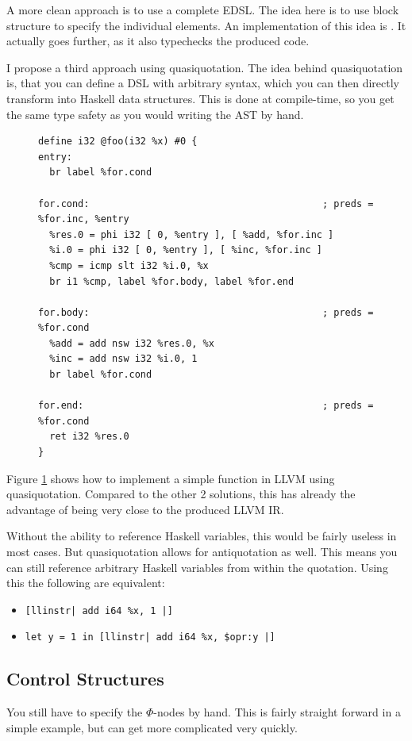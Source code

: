 \documentclass[a4paper,bibliography=totocnumbered,parskip,headsepline]{scrbook}
\begin{document}
A more clean approach is to use a complete EDSL.
The idea here is to use block structure to specify the individual elements.
An implementation of this idea is .
It actually goes further, as it also typechecks the produced code.

I propose a third approach using quasiquotation\cite{mainland2007quote}.
The idea behind quasiquotation is, that you can define a DSL with arbitrary syntax, which you can then directly transform into Haskell data structures.
This is done at compile-time, so you get the same type safety as you would writing the AST by hand.

\begin{figure}
\begin{lstlisting}
define i32 @foo(i32 %x) #0 {
entry:
  br label %for.cond

for.cond:                                         ; preds = %for.inc, %entry
  %res.0 = phi i32 [ 0, %entry ], [ %add, %for.inc ]
  %i.0 = phi i32 [ 0, %entry ], [ %inc, %for.inc ]
  %cmp = icmp slt i32 %i.0, %x
  br i1 %cmp, label %for.body, label %for.end

for.body:                                         ; preds = %for.cond
  %add = add nsw i32 %res.0, %x
  %inc = add nsw i32 %i.0, 1
  br label %for.cond

for.end:                                          ; preds = %for.cond
  ret i32 %res.0
}
\end{lstlisting}
\label{fig:simplequote}
\end{figure}

Figure \ref{fig:simplequote} shows how to implement a simple function in LLVM using quasiquotation.
Compared to the other 2 solutions, this has already the advantage of being very close to the produced LLVM IR.

Without the ability to reference Haskell variables, this would be fairly useless in most cases.
But quasiquotation allows for antiquotation as well.
This means you can still reference arbitrary Haskell variables from within the quotation.
Using this the following are equivalent:
\begin{itemize}[noitemsep]
 \item \lstinline{[llinstr| add i64 %x, 1 |]}
 \item \lstinline{let y = 1 in [llinstr| add i64 %x, $opr:y |]}
\end{itemize}

\subsection{Control Structures}
You still have to specify the $\Phi$-nodes by hand.
This is fairly straight forward in a simple example, but can get more complicated very quickly.
\end{document}
